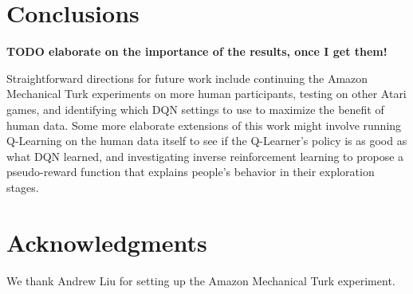 \documentclass[letterpaper, 10 pt, conference]{ieeeconf}  %
\begin{document}
\section{Conclusions}\label{sec:conclusions}

\textbf{TODO elaborate on the importance of the results, once I get them!} 

Straightforward directions for future work include continuing the Amazon Mechanical Turk experiments
on more human participants, testing on other Atari games, and identifying which DQN settings to use
to maximize the benefit of human data. Some more elaborate extensions of this work might involve
running Q-Learning on the human data itself to see if the Q-Learner's policy is as good as what DQN
learned, and investigating inverse reinforcement learning to propose a pseudo-reward function that
explains people's behavior in their exploration stages.

\section*{Acknowledgments}

We thank Andrew Liu for setting up the Amazon Mechanical Turk experiment.



\addtolength{\textheight}{-12cm}





\end{document}
